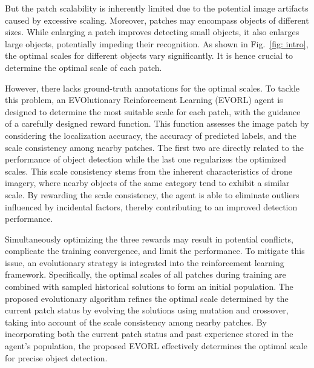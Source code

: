 \documentclass[letterpaper]{article} %
\newcommand\rjf[1]{\textcolor{red}{\{RJF: #1\}}}
\begin{document}
But the patch scalability is inherently limited %
due to the potential image artifacts caused by excessive scaling.
Moreover, patches may encompass objects of different sizes. While enlarging a patch improves detecting small objects, it also enlarges large objects, potentially impeding their recognition. As shown in Fig.~\ref{fig: intro}, the optimal scales for different objects vary significantly. It is hence crucial to determine the optimal scale of each patch.


However, there lacks ground-truth annotations for the optimal scales. To tackle this problem, an EVOlutionary Reinforcement Learning (EVORL) agent is designed to determine the most suitable scale for each patch, with the guidance of a carefully designed reward function. This function assesses the image patch by considering the localization accuracy, the accuracy of predicted labels, and the scale consistency among nearby patches. The first two are directly related to the performance of object detection while the last one regularizes the optimized scales. This scale consistency stems from the inherent characteristics of drone imagery, where nearby objects of the same category tend to exhibit a similar scale. By rewarding the scale consistency, the agent is able to eliminate outliers influenced by incidental factors, thereby contributing to an improved detection performance.


Simultaneously optimizing the three rewards may result in potential conflicts, complicate the training convergence, and limit the performance. To mitigate this issue, an evolutionary strategy is integrated into the reinforcement learning framework. Specifically, the optimal scales of all patches during training are combined with sampled historical solutions to form an initial population. The proposed evolutionary algorithm refines the optimal scale determined by the current patch status by evolving the solutions using mutation and crossover, taking into account of the scale consistency among nearby patches. By incorporating both the current patch status and past experience stored in the agent's population, the proposed EVORL effectively determines the optimal scale for precise object detection.
\end{document}
